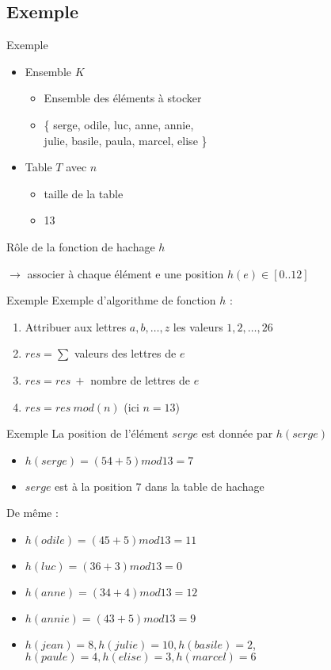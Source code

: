 \documentclass{beamer}
\begin{document}
  \subsection{Exemple}
  \begin{frame}{Exemple}
    \begin{itemize}
      \item{Ensemble $K$}
      \begin{itemize}
        \item{Ensemble des éléments à stocker}
        \item{\{ serge, odile, luc, anne, annie,\\
        julie, basile, paula, marcel, elise \}}
      \end{itemize}
      \item{Table $T$ avec $n$}
      \begin{itemize}
        \item{taille de la table}
        \item{13}
      \end{itemize}
    \end{itemize}

    Rôle de la fonction de hachage $h$

    $\rightarrow$ associer à chaque élément e une position $h(e) \in [0..12]$
  \end{frame}

  \begin{frame}{Exemple}
    Exemple d’algorithme de fonction $h$ :
    \begin{enumerate}
      \item{Attribuer aux lettres $a,b,\ldots,z$ les valeurs $1,2,\ldots,26$}
      \item{$res = \sum$ valeurs des lettres de $e$}
      \item{$res = res\ +$ nombre de lettres de $e$}
      \item{$res = res\ mod(n)$ (ici $n = 13$)}
    \end{enumerate}
  \end{frame}
  \begin{frame}{Exemple}
    La position de l’élément $serge$ est donnée par $h(serge)$
    \begin{itemize}
      \item{$h(serge) = (54 + 5)mod13 = 7$}
      \item{$serge$ est à la position $7$ dans la table de hachage}
    \end{itemize}

    De même :
    \begin{itemize}
      \item{$h(odile) = (45 + 5)mod13 = 11$}
      \item{$h(luc) = (36 + 3)mod13 = 0$}
      \item{$h(anne) = (34 + 4)mod13 = 12$}
      \item{$h(annie) = (43 + 5)mod13 = 9$}
      \item{$h(jean) = 8, h(julie) = 10, h(basile) = 2$,\\
      $h(paule) = 4, h(elise) = 3, h(marcel) = 6$}
    \end{itemize}
  \end{frame}
\end{document}
